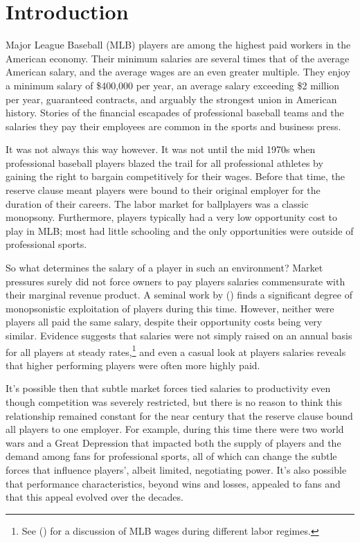 \documentclass[12pt]{article}
\newcommand{\citee}[1]{\citename{#1} (\citeyear{#1})}
\begin{document}
\section{Introduction}\label{s:intro}
Major League Baseball (MLB) players are among the highest paid workers in the American economy.  Their minimum salaries are several times that of the average American salary, and the average wages are an even greater multiple.  They enjoy a minimum salary of \$400,000 per year, an average salary exceeding \$2 million per year, guaranteed contracts, and arguably the strongest union in American history.  Stories of the financial escapades of professional baseball teams and the salaries they pay their employees are common in the sports and business press.

It was not always this way however.  It was not until the mid 1970s when professional baseball players blazed the trail for all professional athletes by gaining the right to bargain competitively for their wages.  Before that time, the reserve clause meant players were bound to their original employer for the duration of their careers.  The labor market for ballplayers was a classic monopsony.  Furthermore, players typically had a very low opportunity cost to play in MLB; most had little schooling and the only opportunities were outside of professional sports.  

So what determines the salary of a player in such an environment?  Market pressures surely did not force owners to pay players salaries commensurate with their marginal revenue product.  A seminal work by \citee{scully1974} finds a significant degree of monopsonistic exploitation of players during this time.  However, neither were players all paid the same salary, despite their opportunity costs being very similar.  Evidence suggests that salaries were not simply raised on an annual basis for all players at steady rates,\footnote{See \citee{haupert2009} for a discussion of MLB wages during different labor regimes.} and even a casual look at players salaries reveals that higher performing players were often more highly paid.  

It's possible then that subtle market forces tied salaries to productivity even though competition was severely restricted, but there is no reason to think this relationship remained constant for the near century that the reserve clause bound all players to one employer.  For example, during this time there were two world wars and a Great Depression that impacted both the supply of players and the demand among fans for professional sports, all of which can change the subtle forces that influence players', albeit limited, negotiating power.  It's also possible that performance characteristics, beyond wins and losses, appealed to fans and that this appeal evolved over the decades. 
\end{document}
